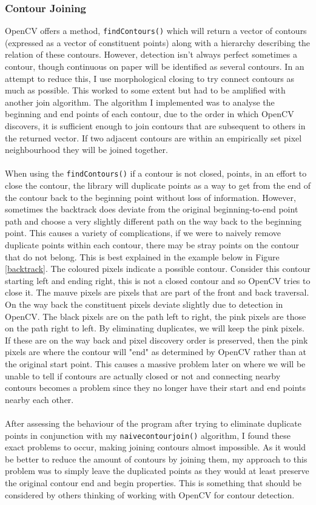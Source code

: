 \documentclass[11pt]{article}
\begin{document}
\subsubsection{Contour Joining}
OpenCV offers a method, \texttt{findContours()} which will return a
vector of contours (expressed as a vector of constituent points) along with
a hierarchy describing the relation of these contours. However, detection
isn't always perfect sometimes a contour, though continuous on paper
will be identified as several contours. In an attempt to reduce this, I 
use morphological closing to try connect contours as much as possible.
This worked to some extent but had to be amplified with another join
algorithm. The algorithm I implemented was to analyse the beginning and end points
of each contour, due to the order in which OpenCV discovers, it is sufficient 
enough to join contours that are subsequent to others in the returned
vector. If two adjacent contours are within an empirically set pixel
neighbourhood they will be joined together. \\
\\
When using the \texttt{findContours()} if a contour is not closed,
points, in an effort to close the contour, the library will duplicate 
points as a way to get from the end of the contour back to the beginning
point without loss of information. However, sometimes the backtrack does
deviate from the original beginning-to-end point path and choose a very
slightly different path on the way back to the beginning point. This causes 
a variety of complications, if we were to naively remove duplicate points
within each contour, there may be stray points on the contour that do not
belong. This is best explained in the example below in Figure \ref{backtrack}.
The coloured pixels indicate a possible contour. Consider this contour
starting left and ending right, this is not a closed contour and
so OpenCV tries to close it. The mauve pixels are pixels that are part
of the front and back traversal. On the way back the constituent pixels
deviate slightly due to detection in OpenCV. The black pixels are
on the path left to right, the pink pixels are those on the path right to left.
By eliminating duplicates, we will keep the pink pixels. If these are on the
way back and pixel discovery order is preserved, then the pink pixels are
where the contour will "end" as determined by OpenCV rather than at the 
original start point. This causes a massive problem later on where we
will be unable to tell if contours are actually closed or not and connecting
nearby contours becomes a problem since they no longer have their
start and end points nearby each other. \\
\\
After assessing the behaviour of 
the program after trying to eliminate duplicate points in conjunction 
with my \texttt{naivecontourjoin()} algorithm, I found these exact
problems to occur, making joining contours almost impossible. As it
would be better to reduce the amount of contours by joining them, my approach
to this problem was to simply leave the duplicated points as they would 
at least preserve the original contour end and begin properties. This is
something that should be considered by others thinking of working with
OpenCV for contour detection.
\end{document}
